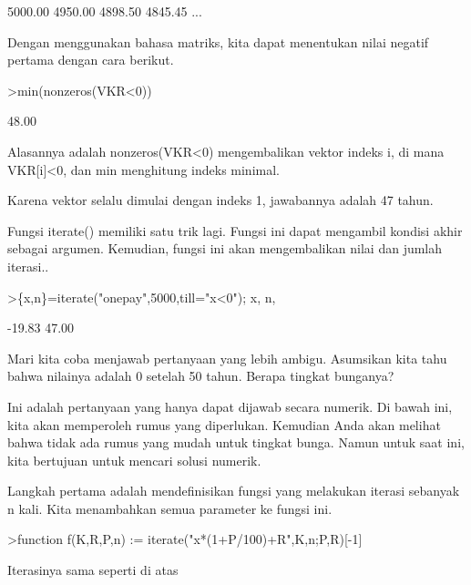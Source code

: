 \documentclass[a4paper,10pt]{article}
\begin{document}
\begin{eulernotebook}
\begin{eulercomment}
\begin{eulercomment}
\begin{eulercomment}
\begin{eulercomment}
\begin{eulercomment}
\begin{eulercomment}
\begin{eulercomment}
\begin{eulercomment}
\begin{eulercomment}
\begin{eulercomment}
\begin{euleroutput}
      5000.00     4950.00     4898.50     4845.45     ...
\end{euleroutput}
\begin{eulercomment}
Dengan menggunakan bahasa matriks, kita dapat menentukan nilai negatif
pertama dengan cara berikut.
\end{eulercomment}
\begin{eulerprompt}
>min(nonzeros(VKR<0))
\end{eulerprompt}
\begin{euleroutput}
        48.00 
\end{euleroutput}
\begin{eulercomment}
Alasannya adalah nonzeros(VKR\textless{}0) mengembalikan vektor indeks i, di
mana VKR[i]\textless{}0, dan min menghitung indeks minimal.

Karena vektor selalu dimulai dengan indeks 1, jawabannya adalah 47
tahun.

Fungsi iterate() memiliki satu trik lagi. Fungsi ini dapat mengambil
kondisi akhir sebagai argumen. Kemudian, fungsi ini akan mengembalikan
nilai dan jumlah iterasi..
\end{eulercomment}
\begin{eulerprompt}
>\{x,n\}=iterate("onepay",5000,till="x<0"); x, n,
\end{eulerprompt}
\begin{euleroutput}
       -19.83 
        47.00 
\end{euleroutput}
\begin{eulercomment}
Mari kita coba menjawab pertanyaan yang lebih ambigu. Asumsikan kita
tahu bahwa nilainya adalah 0 setelah 50 tahun. Berapa tingkat
bunganya?

Ini adalah pertanyaan yang hanya dapat dijawab secara numerik. Di
bawah ini, kita akan memperoleh rumus yang diperlukan. Kemudian Anda
akan melihat bahwa tidak ada rumus yang mudah untuk tingkat bunga.
Namun untuk saat ini, kita bertujuan untuk mencari solusi numerik.

Langkah pertama adalah mendefinisikan fungsi yang melakukan iterasi
sebanyak n kali. Kita menambahkan semua parameter ke fungsi ini.
\end{eulercomment}
\begin{eulerprompt}
>function f(K,R,P,n) := iterate("x*(1+P/100)+R",K,n;P,R)[-1]
\end{eulerprompt}
\begin{eulercomment}
Iterasinya sama seperti di atas


\end{eulercomment}
\end{eulercomment}
\end{eulercomment}
\end{eulercomment}
\end{eulercomment}
\end{eulercomment}
\end{eulercomment}
\end{eulercomment}
\end{eulercomment}
\end{eulercomment}
\end{eulercomment}
\end{eulernotebook}
\end{document}
